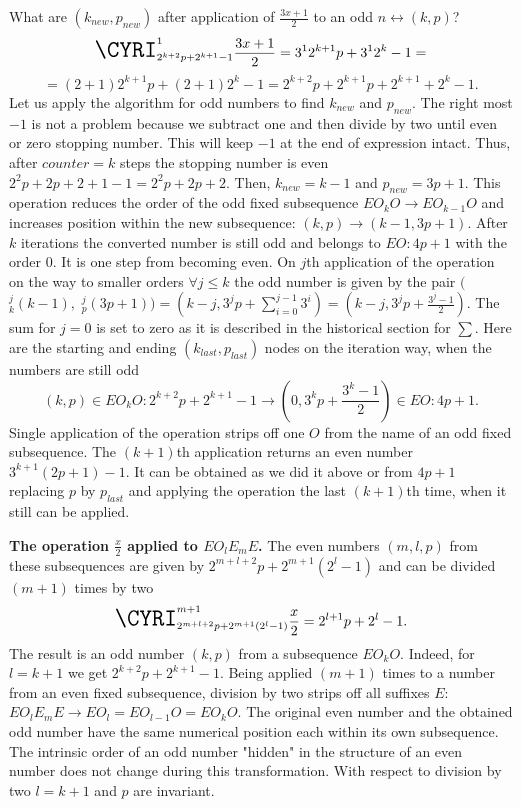 \documentclass{article}
\begin{document}
What are $(k_{new}, p_{new})$ after application of $\frac{3x+1}{2}$ to an odd $n \leftrightarrow (k,p)$?
\begin{displaymath}
\textrm{\LARGE{\CYRI}}_{2^{k + 2}p + 2^{k + 1} - 1}^{1}\frac{3x + 1}{2} = 3^{1}2^{k + 1}p + 3^{1}2^k - 1 =
\end{displaymath}
\begin{displaymath}
 = (2 + 1)2^{k + 1}p + (2+1)2^k - 1 = 2^{k + 2}p + 2^{k + 1}p + 2^{k+1} + 2^k - 1.
\end{displaymath}
Let us apply the algorithm for odd numbers to find $k_{new}$ and $p_{new}$. The right most $-1$ is not a problem because we subtract one and then divide by two until even or zero stopping number. This will keep $-1$ at the end of expression intact. Thus, after $counter = k$ steps the stopping number is even $2^{2}p + 2p + 2 + 1 - 1 = 2^{2}p + 2p + 2$. Then, $k_{new} = k - 1$ and $p_{new} = 3p + 1$. This operation reduces the order of the odd fixed subsequence $EO_kO \to EO_{k-1}O$ and increases position within the new subsequence: $(k, p) \to (k-1, 3p+1)$. After $k$ iterations the converted number is still odd and belongs to $EO:4p+1$ with the order $0$. It is one step from becoming even. On $j$th application of the operation on  the way to smaller orders $\forall j \leq k$ the odd number is given by the pair $($\CYRI$_{k}^{j}(k-1),$ \CYRI$_{p}^{j}(3p+1)) = (k - j, 3^j{p}+\sum_{i=0}^{j-1}3^i) = (k - j, 3^j{p}+\frac{3^j-1}{2})$. The sum for $j = 0$ is set to zero as it is described in the historical section for $\sum$. Here are the starting and ending $(k_{last}, p_{last})$ nodes on the iteration way, when the numbers are still odd
\begin{displaymath}
(k, p) \in EO_k{O}:2^{k + 2}p + 2^{k + 1} - 1 \to (0, 3^{k}p+\frac{3^k-1}{2}) \in EO:4p+1.
\end{displaymath}
Single application of the operation strips off one $O$ from the name of an odd fixed subsequence. The $(k+1)$th application returns an even number $3^{k+1}(2p + 1) - 1$. It can be obtained as we did it above or from $4p+1$ replacing $p$ by $p_{last}$ and applying the operation the last $(k+1)$th time, when it still can be applied.

\textbf{The operation $\frac{x}{2}$ applied to $EO_l{E_m}E$.} The even numbers $(m, l, p)$ from these subsequences are given by $2^{m + l + 2}p + 2^{m+1}(2^l -1)$ and can be divided $(m+1)$ times by two
\begin{displaymath}
\textrm{\LARGE{\CYRI}}_{2^{m + l + 2}p + 2^{m+1}(2^l -1)}^{m+1}\frac{x}{2} = 2^{l + 1}p + 2^l -1.
\end{displaymath}
The result is an odd number $(k, p)$ from a subsequence $EO_k{O}$. Indeed, for $l = k + 1$ we get $2^{k + 2}p + 2^{k+1} -1$. Being applied $(m+1)$ times to a number from an even fixed subsequence, division by two strips off all suffixes $E$: $EO_l{E_m}E \to EO_l = EO_{l-1}O = EO_k{O}$. The original even number and the obtained odd number have the same numerical position each within its own subsequence. The intrinsic order of an odd number "hidden" in the structure of an even number does not change during this transformation. With respect to division by two $l = k + 1$ and $p$ are invariant. 
\end{document}
